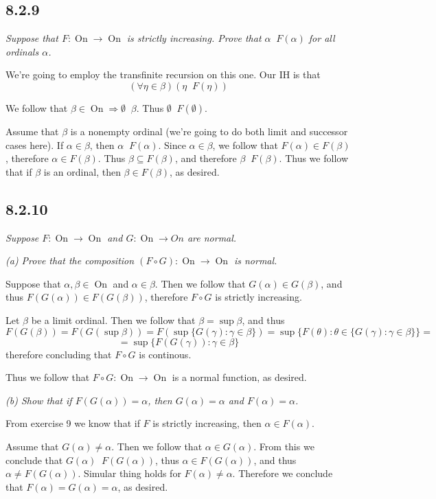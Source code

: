 \documentclass[11pt,oneside,titlepage]{book}
\DeclareMathOperator \ra {\Rightarrow}
\DeclareMathOperator \On {On}
\DeclareMathOperator \ineq {\underline{\in}}
\newcommand{\set}[1]{\{ #1 \}}
\begin{document}
\subsection*{8.2.9}

\textit{Suppose that $F: \On \to \On$ is strictly increasing. Prove that
  $\alpha \ineq F(\alpha)$ for all ordinals $\alpha$.}

We're going to employ the transfinite recursion on this one.
Our IH is that
$$(\forall \eta \in \beta)(\eta \ineq F(\eta))$$

We follow that $\beta \in \On \ra \emptyset \ineq \beta$. Thus $\emptyset \ineq F(\emptyset)$.

Assume that $\beta$ is a nonempty ordinal (we're going to do both limit and successor
cases here). If $\alpha \in \beta$,
then $\alpha \ineq F(\alpha)$. Since $\alpha \in \beta$, we follow that $F(\alpha) \in F(\beta)$,
therefore $\alpha \in F(\beta)$. Thus $\beta \subseteq F(\beta)$, and therefore
$\beta \ineq F(\beta)$. Thus we follow that if $\beta$ is an ordinal, then $\beta \in F(\beta)$,
as desired.

\subsection*{8.2.10}

\textit{Suppose $F: \On \to \On$ and $G: \On \to On$ are normal.}

\textit{(a) Prove that the composition $(F \circ G): \On \to \On$ is normal.}

Suppose that $\alpha, \beta \in \On$ and $\alpha \in \beta$. Then we follow that
$G(\alpha) \in G(\beta)$, and thus $F(G(\alpha)) \in F(G(\beta))$,
therefore $F \circ G$ is strictly increasing.

Let $\beta$ be a limit ordinal. Then we follow that $\beta = \sup \beta$, and thus 
$$F(G(\beta)) = F(G(\sup \beta)) = F(\sup\set{G(\gamma): \gamma \in \beta}) =
\sup \set{F(\theta): \theta \in \set{G(\gamma): \gamma \in \beta}} =$$
$$ =
\sup \set{F(G(\gamma)): \gamma \in \beta} $$
therefore concluding that $F \circ G$ is continous.

Thus we follow that $F \circ G: \On \to \On$ is a normal function, as desired.

\textit{(b) Show that if $F(G(\alpha)) = \alpha$, then $G(\alpha) = \alpha$ and
  $F(\alpha) = \alpha$.}

From exercise 9 we know that if $F$ is strictly increasing, then $\alpha \in F(\alpha)$.

Assume that $G(\alpha) \neq \alpha$. Then we follow that $\alpha \in G(\alpha)$.
From this we conclude that $G(\alpha) \ineq F(G(\alpha ))$, thus
$\alpha \in F(G(\alpha))$, and thus $\alpha \neq F(G(\alpha))$. Simular thing holds for
$F(\alpha) \neq \alpha$. Therefore we conclude that $F(\alpha) = G(\alpha) = \alpha$, as desired.
\end{document}

